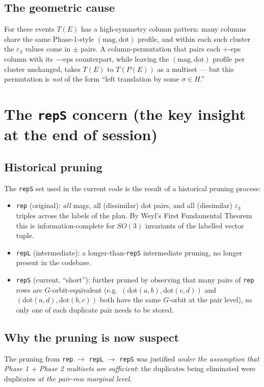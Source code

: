 \documentclass[a4paper,11pt]{article}
\begin{document}
\subsection{The geometric cause}
For these events $T(E)$ has a high-symmetry column pattern: many
columns share the same Phase-1-style $(\text{mag}, \text{dot})$
profile, and within each such cluster the $\varepsilon_3$ values come
in $\pm$ pairs.  A column-permutation that pairs each $+$-eps column
with its $-$-eps counterpart, while leaving the $(\text{mag}, \text{dot})$
profile per cluster unchanged, takes $T(E)$ to $T(P(E))$ as a
multiset --- but this permutation is \emph{not} of the form ``left
translation by some $\sigma \in H$.''

\section{The \texttt{repS} concern (the key insight at the end of session)}

\subsection{Historical pruning}
The \texttt{repS} set used in the current code is the result of a
historical pruning process:

\begin{itemize}[nosep]
  \item \texttt{rep} (original): \emph{all} mags, all (dissimilar)
        dot pairs, and all (dissimilar) $\varepsilon_3$ triples
        across the labels of the plan.  By Weyl's First Fundamental
        Theorem this is information-complete for $SO(3)$ invariants
        of the labelled vector tuple.
  \item \texttt{repL} (intermediate): a longer-than-\texttt{repS}
        intermediate pruning, no longer present in the codebase.
  \item \texttt{repS} (current, ``short''): further pruned by
        observing that many pairs of \texttt{rep} rows are
        $G$-orbit-equivalent (e.g.\ $(\text{dot}(a,b), \text{dot}(c,d))$
        and $(\text{dot}(a,d), \text{dot}(b,c))$ both have the same
        $G$-orbit at the pair level), so only one of each duplicate
        pair needs to be stored.
\end{itemize}

\subsection{Why the pruning is now suspect}
The pruning from \texttt{rep} $\to$ \texttt{repL} $\to$ \texttt{repS}
was justified \emph{under the assumption that Phase 1 + Phase 2
multisets are sufficient}: the duplicates being eliminated were
duplicates \emph{at the pair-row marginal level}.
\end{document}
